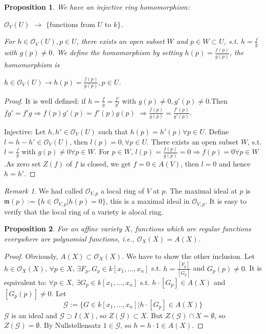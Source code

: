 \documentclass{amsart}
\theoremstyle{plain}
\newtheorem{proposition}{Proposition}
\theoremstyle{definition}
\theoremstyle{remark}
\newtheorem*{remark}{Remark}
\numberwithin{equation}{section}
\begin{document}
\begin{proposition}
	We have an injective ring homomorphism:\begin{center}
		$ \mathcal{O}_V(U) $ $ \to $ $ \{ \text{functions from }U \text{ to } k \} $.
	\end{center}
	For $ h\in \mathcal{O}_V(U),p\in U $, there exists an open subset $ W $ and $ p\in W\subset U $, s.t. $ h=\frac{f}{g} $ with $ g(p)\neq 0 $. We define the homomorphism by setting $ h(p)=\frac{f(p)}{g(p)} $, the homomorphism is
	\begin{center}
		$ h\in \mathcal{O}_V(U)\to h(p)=\frac{f(p)}{g(p)}, p\in U $.
	\end{center}
\end{proposition}
\begin{proof}
	It is well defined: if $ h=\frac{f}{g}=\frac{f'}{g'} $ with $ g(p)\neq 0,g'(p)\neq 0 $.Then $ fg'=f'g \Rightarrow f(p)g'(p)=f'(p)g(p)$ $ \Rightarrow \frac{f(p)}{g(p)}=\frac{f'(p)}{g'(p)} $.

	Injective: Let $ h,h'\in \mathcal{O}_V(U) $ such that $ h(p)=h'(p) \forall p\in U$.
	Define $ l=h-h'\in \mathcal{O}_V(U) $, then $ l(p)=0 ,\forall p\in U$. There exists an open subset $ W $, s.t. $ l=\frac{f}{g} $ with $ g(p)\neq 0 \forall p\in W $. For $ p\in W $, $ l(p)=\frac{f(p)}{g(p)}=0\Rightarrow f(p)=0 \forall p\in W $.As zero set $ Z(f) $ of $ f $ is closed, we get $ f=0\in A(V) $, then $ l=0 $ and hence $ h=h' $.
\end{proof}
\begin{remark}
	We had called $ \mathcal{O}_{V,p} $ a local ring of $ V $ at $ p $. The maximal ideal at $ p $ is $ \mathfrak{m}(p):=\{ h\in \mathcal{O}_{V,p}|h(p)=0 \} $, this is a maximal ideal in $ \mathcal{O}_{V,p} $. It is easy to verify that the local ring of a variety is alocal ring.
\end{remark}
\begin{proposition}\label{10}
	For an affine variety $ X $, functions which are regular functions everywhere are polynomial functions, i.e., $ \mathcal{O}_X(X)=A(X) $.
\end{proposition}
\begin{proof}
	Obviously, $ A(X)\subset \mathcal{O}_X(X) $. We have to show the other inclusion. Let $ h\in \mathcal{O}_X(X) $, $ \forall p\in X $, $ \exists F_p,G_p\in k[x_1,\dots,x_n] $ s.t.
	$ h=\frac{[F_p]}{[G_p]} $ and $ G_p(p)\neq 0 $. It is equivalent to: $ \forall p\in X $, $ \exists G_p\in k[x_1,\dots,x_n] $ s.t. $ h\cdot [G_p] \in A(X)$ and $ [G_p(p)]\neq 0 $. Let
	\begin{equation}
	\mathcal{G}:=\{ G\in k[x_1,\dots,x_n]|h\cdot [G_p]\in A(X) \}
	\end{equation}
	$ \mathcal{G} $ is an ideal and $ \mathcal{G}\supset I(X) $, so $ Z(\mathcal{G})\subset X $. But $ Z(\mathcal{G})\cap X=\emptyset $, so $ Z(\mathcal{G})=\emptyset $. By Nullstellensatz $ 1\in\mathcal{G} $, so $ h=h\cdot 1\in A(X) $.
\end{proof}
\end{document}
